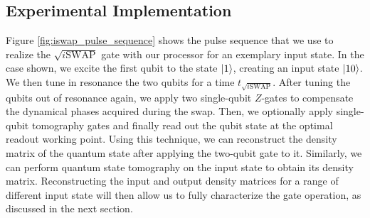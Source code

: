 \subsection{Experimental Implementation}

Figure \ref{fig:iswap_pulse_sequence} shows the pulse sequence that we use to realize the $\sqrt{i\mathrm{SWAP}}$ gate with our processor for an exemplary input state. In the case shown, we excite the first qubit to the state $\left| 1 \right>$, creating an input state $\left| 10 \right>$. We then tune in resonance the two qubits for a time $t_{\sqrt{i\mathrm{SWAP}}}$. After tuning the qubits out of resonance again, we apply two single-qubit $Z$-gates to compensate the dynamical phases acquired during the swap. Then, we optionally apply single-qubit tomography gates and finally read out the qubit state at the optimal readout working point. Using this technique, we can reconstruct the density matrix of the quantum state after applying the two-qubit gate to it. Similarly, we can perform quantum state tomography on the input state to obtain its density matrix. Reconstructing the input and output density matrices for a range of different input state will then allow us to fully characterize the gate operation, as discussed in the next section.

